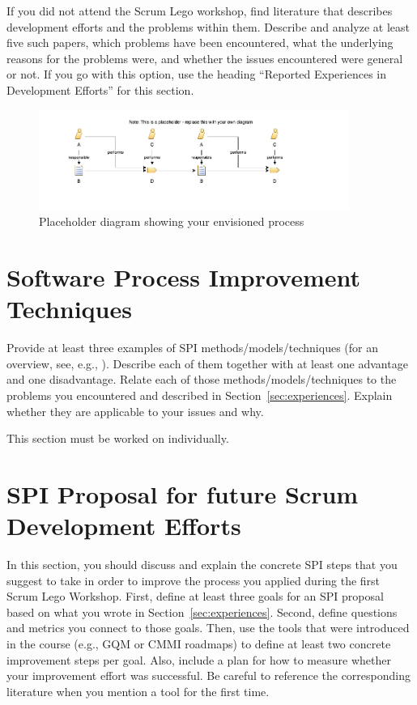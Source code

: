 \documentclass[conference]{IEEEtran}
\begin{document}
If you did not attend the Scrum Lego workshop, find literature that describes development efforts and the problems within them. Describe and analyze at least five such papers, which problems have been encountered, what the underlying reasons for the problems were, and whether the issues encountered were general or not. If you go with this option, use the heading ``Reported Experiences in Development Efforts'' for this section.


\begin{figure}
	\centering
	\includegraphics[width=0.9\textwidth]{assets/placeholder_diagram}
	\caption{Placeholder diagram showing your envisioned process}
	\label{fig:placeholderdiagram}
\end{figure}
\section{Software Process Improvement Techniques}
\label{sec:spi-techniques}
Provide at least three examples of SPI methods/models/techniques (for an overview, see, e.g., \cite{Pettersson2008}). Describe each of them together with at least one advantage and one disadvantage.
Relate each of those methods/models/techniques to the problems you encountered and described in Section~\ref{sec:experiences}.
Explain whether they are applicable to your issues and why.

This section must be worked on individually.

\section{SPI Proposal for future Scrum Development Efforts}
\label{sec:proposal}
In this section, you should discuss and explain the concrete SPI steps that you suggest to take in order to improve the process you applied during the first Scrum Lego Workshop. First, define at least three goals for an SPI proposal based on what you wrote in Section~\ref{sec:experiences}. Second, define questions and metrics you connect to those goals.
Then, use the tools that were introduced in the course (e.g., GQM or CMMI roadmaps) to define at least two concrete improvement steps per goal. Also, include a plan for how to measure whether your improvement effort was successful. Be careful to reference the corresponding literature when you mention a tool for the first time.
\end{document}
